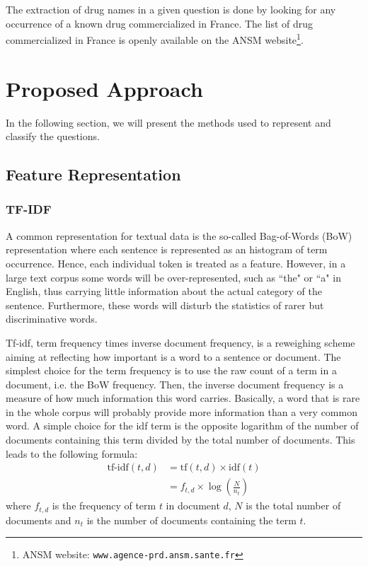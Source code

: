 \documentclass[11pt,twocolumn,letterpaper]{article}
\begin{document}
The extraction of drug names in a given question is done by looking for any occurrence of a known drug commercialized in France. The list of drug commercialized in France is openly available on the ANSM website\footnote{ANSM website: \texttt{www.agence-prd.ansm.sante.fr}}.

\section{Proposed Approach}

In the following section, we will present the methods used to represent and classify the questions. 

\subsection{Feature Representation}


\subsubsection{TF-IDF}

A common representation for textual data is the so-called Bag-of-Words (BoW) representation where each sentence is represented as an histogram of term occurrence. Hence, each individual token is treated as a feature. However, in a large text corpus some words will be over-represented, such as ``the" or ``a" in English, thus carrying little information about the actual category of the sentence. Furthermore, these words will disturb the statistics of rarer but discriminative words.

Tf-idf, term frequency times inverse document frequency, is a reweighing scheme aiming at reflecting how important is a word to a sentence or document. The simplest choice for the term frequency is to use the raw count of a term in a document, i.e. the BoW frequency. Then, the inverse document frequency is a measure of how much information this word carries. Basically, a word that is rare in the whole corpus will probably provide more information than a very common word. A simple choice for the idf term is the opposite logarithm of the number of documents containing this term divided by the total number of documents. This leads to the following formula:
\begin{align*}
\text{tf-idf}(t,d) &= \text{tf}(t, d) \times \text{idf}(t)\\
&= f_{t,d} \times \log\left(\frac{N}{n_{t}}\right)
\end{align*}
where $f_{t,d}$ is the frequency of term $t$ in document $d$, $N$ is the total number of documents and $n_{t}$ is the number of documents containing the term $t$.
\end{document}
